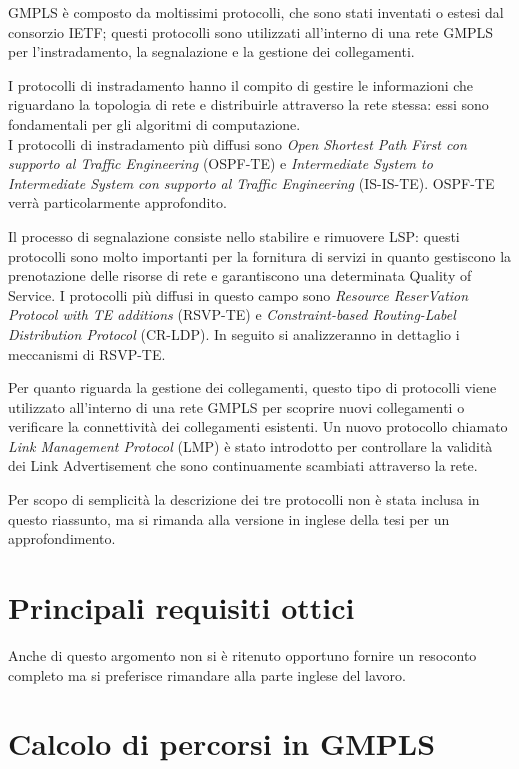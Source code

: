 \documentclass[10pt,a4paper]{report}
\begin{document}
GMPLS è composto da moltissimi protocolli, che sono stati inventati o
estesi dal consorzio IETF; questi protocolli sono utilizzati
all'interno di una rete GMPLS per l'instradamento, la segnalazione e
la gestione dei collegamenti. 

I protocolli di instradamento hanno il compito di gestire le
informazioni che riguardano la topologia di rete e distribuirle
attraverso la rete stessa: essi sono fondamentali per gli algoritmi di
computazione. \\
I protocolli di instradamento più diffusi sono \textit{Open Shortest
  Path First con supporto al Traffic Engineering} (OSPF-TE) e
\textit{Intermediate System to Intermediate System con supporto al
  Traffic Engineering} (IS-IS-TE). OSPF-TE verrà particolarmente
approfondito.

Il processo di segnalazione consiste nello stabilire e rimuovere LSP:
questi protocolli sono molto importanti per la fornitura di servizi in
quanto gestiscono la prenotazione delle risorse di rete e garantiscono
una determinata Quality of Service. I protocolli più diffusi in questo
campo sono \textit{Resource ReserVation Protocol with TE additions}
(RSVP-TE) e \textit{Constraint-based Routing-Label Distribution
  Protocol} (CR-LDP). In seguito si analizzeranno in dettaglio i
meccanismi di RSVP-TE.

Per quanto riguarda la gestione dei collegamenti, questo tipo di
protocolli viene utilizzato all'interno di una rete GMPLS per scoprire
nuovi collegamenti o verificare la connettività dei collegamenti
esistenti. Un nuovo protocollo chiamato \textit{Link Management
  Protocol} (LMP) è stato introdotto per controllare la validità dei
Link Advertisement che sono continuamente scambiati attraverso la
rete.

Per scopo di semplicità la descrizione dei tre protocolli non è stata
inclusa in questo riassunto, ma si rimanda alla versione in inglese
della tesi per un approfondimento.

\section*{Principali requisiti ottici}

Anche di questo argomento non si è ritenuto opportuno fornire un
resoconto completo ma si preferisce rimandare alla parte inglese del
lavoro.

\newpage

\section*{Calcolo di percorsi in GMPLS}
\end{document}
